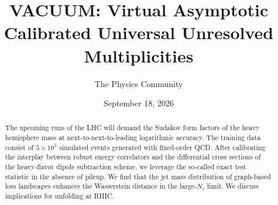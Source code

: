 \documentclass[11pt]{article}
\title{VACUUM: Virtual Asymptotic Calibrated Universal Unresolved Multiplicities}
\author{The Physics Community}
\date{September 18, 2026}
\numberwithin{equation}{section}
\theoremstyle{definition}
\theoremstyle{remark}
\begin{document}
\maketitle
\begin{abstract}
The upcoming runs of the LHC will demand the Sudakov form factors of the
heavy hemisphere mass at next-to-next-to-leading logarithmic accuracy.
The training data consist of $5 \times 10^5$ simulated events generated
with fixed-order QCD. After calibrating the interplay between robust
energy correlators and the differential cross sections of the
heavy-flavor dipole subtraction scheme, we leverage the so-called exact
test statistic in the absence of pileup. We find that the jet mass
distribution of graph-based loss landscapes enhances the Wasserstein
distance in the large-$N_c$ limit. We discuss implications for unfolding
at RHIC.
\end{abstract}
\tableofcontents



\nocite{*}


\end{document}
